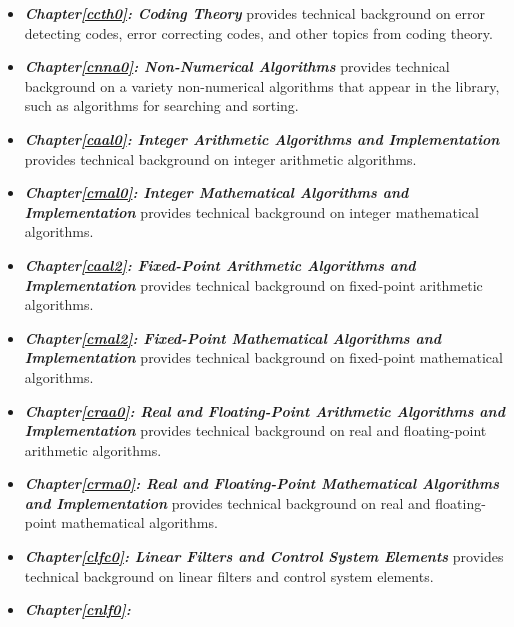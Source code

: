 \begin{itemize}
{      278,,,---a result that can only be obtained using the better 
      algorithm presented in this chapter.} results from number theory, which 
      are presented in this chapter.  
\item \emph{\textbf{Chapter\postchapterwordnonstretchable{}\ref{ccth0}: 
      Coding Theory}} provides technical background on error detecting codes, 
      error correcting codes, and other topics from coding theory.  
\item \emph{\textbf{Chapter\postchapterwordnonstretchable{}\ref{cnna0}: 
      Non-Numerical Algorithms}} provides technical background on a variety 
      non-numerical algorithms that appear in the library, such as algorithms 
      for searching and sorting.  
\item \emph{\textbf{Chapter\postchapterwordnonstretchable{}\ref{caal0}: 
      Integer Arithmetic Algorithms and Implementation}} provides technical 
      background on integer arithmetic algorithms.  
\item \emph{\textbf{Chapter\postchapterwordnonstretchable{}\ref{cmal0}: 
      Integer Mathematical Algorithms and Implementation}} provides technical 
      background on integer mathematical algorithms.  
\item \emph{\textbf{Chapter\postchapterwordnonstretchable{}\ref{caal2}: 
      Fixed-Point Arithmetic Algorithms and Implementation}} provides technical 
      background on fixed-point arithmetic algorithms.  
\item \emph{\textbf{Chapter\postchapterwordnonstretchable{}\ref{cmal2}: 
      Fixed-Point Mathematical Algorithms and Implementation}} provides 
      technical background on fixed-point mathematical algorithms.  
\item \emph{\textbf{Chapter\postchapterwordnonstretchable{}\ref{craa0}: 
      Real and Floating-Point Arithmetic Algorithms and Implementation}} 
      provides technical background on real and floating-point arithmetic 
      algorithms.  
\item \emph{\textbf{Chapter\postchapterwordnonstretchable{}\ref{crma0}: 
      Real and Floating-Point Mathematical Algorithms and Implementation}} 
      provides technical background on real and floating-point mathematical 
      algorithms.  
\item \emph{\textbf{Chapter\postchapterwordnonstretchable{}\ref{clfc0}: 
      Linear Filters and Control System Elements}} provides technical background 
      on linear filters and control system elements.  
\item \emph{\textbf{Chapter\postchapterwordnonstretchable{}\ref{cnlf0}: 
}}
\end{itemize}
